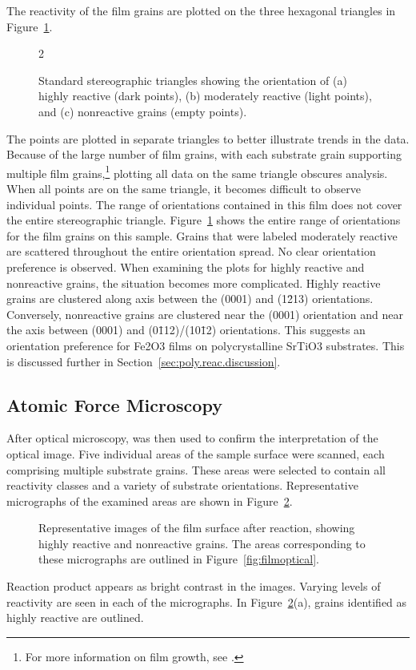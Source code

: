 \documentclass[12pt,%
              twoside,
               letterpaper]{uiothesis}
\begin{document}
The reactivity of the film grains are plotted on the three hexagonal triangles in
Figure~\ref{fig:filmplots}. 
\begin{figure}2
		\caption[Orientation of film grains]{%
			Standard stereographic triangles showing the orientation
			of (a) highly reactive (dark points), (b) moderately reactive
			(light points), and (c) nonreactive grains (empty points).}
	\label{fig:filmplots}

\end{figure}
The points are plotted in separate triangles to better illustrate trends in the data.
Because of the large number of film grains, with each substrate grain supporting multiple
film grains,\footnote{For more information on film growth, see
.} plotting all data on the same triangle obscures
analysis. When all points are on the same triangle, it becomes difficult to observe
individual points. The range of orientations contained in this film does not cover the
entire stereographic triangle. Figure~\ref{fig:filmplots} shows the entire range of
orientations for the film grains on this sample. Grains that were labeled moderately
reactive are scattered throughout the entire orientation spread. No clear orientation
preference is observed. When examining the plots for highly reactive and nonreactive
grains, the situation becomes more complicated. Highly reactive grains are clustered along
axis between the (0001) and (1\={2}13) orientations. Conversely, nonreactive grains are
clustered near the (0001) orientation and near the axis between (0001) and
(0\={1}12)/(10\={1}2) orientations. This suggests an orientation preference for
Fe2O3 films on polycrystalline SrTiO3 substrates. This is discussed further in
Section~\ref{sec:poly.reac.discussion}.


\subsection{Atomic Force Microscopy}
\label{subsec:poly.reac.afm}


After optical microscopy,  was then used to confirm the interpretation of the
optical image. Five individual areas of the sample surface were scanned, each comprising
multiple substrate grains. These areas were selected to contain all reactivity classes and
a variety of substrate orientations. Representative  micrographs of the examined
areas are shown in Figure~\ref{fig:filmafm}.
\begin{figure}
\centering
		\caption[Representative  images of film]{%
			Representative  images of the film surface after
			reaction, showing highly reactive and nonreactive grains. The 
			areas corresponding to these micrographs are outlined in 
			Figure~\ref{fig:filmoptical}. }
	\label{fig:filmafm}
\end{figure}
Reaction product appears as bright contrast in the  images. Varying levels of
reactivity are seen in each of the micrographs. In Figure~\ref{fig:filmafm}(a), grains
identified as highly reactive are outlined.
\end{document}
